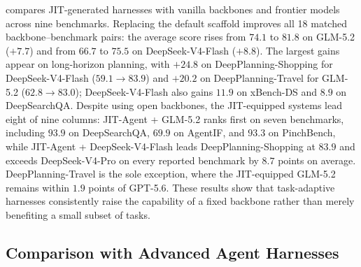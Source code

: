 \documentclass{article}
\newcommand{\ourmethod}{JIT-Agent\xspace}
\begin{document}
 compares JIT-generated harnesses with vanilla backbones and frontier models across nine benchmarks. Replacing the default scaffold improves all 18 matched backbone--benchmark pairs: the average score rises from $74.1$ to $81.8$ on GLM-5.2 ($+7.7$) and from $66.7$ to $75.5$ on DeepSeek-V4-Flash ($+8.8$). The largest gains appear on long-horizon planning, with $+24.8$ on DeepPlanning-Shopping for DeepSeek-V4-Flash ($59.1\!\rightarrow\!83.9$) and $+20.2$ on DeepPlanning-Travel for GLM-5.2 ($62.8\!\rightarrow\!83.0$); DeepSeek-V4-Flash also gains $11.9$ on xBench-DS and $8.9$ on DeepSearchQA. Despite using open backbones, the JIT-equipped systems lead eight of nine columns: \ourmethod{} + GLM-5.2 ranks first on seven benchmarks, including $93.9$ on DeepSearchQA, $69.9$ on AgentIF, and $93.3$ on PinchBench, while \ourmethod{} + DeepSeek-V4-Flash leads DeepPlanning-Shopping at $83.9$ and exceeds DeepSeek-V4-Pro on every reported benchmark by $8.7$ points on average. DeepPlanning-Travel is the sole exception, where the JIT-equipped GLM-5.2 remains within $1.9$ points of GPT-5.6. These results show that task-adaptive harnesses consistently raise the capability of a fixed backbone rather than merely benefiting a small subset of tasks.

\vspace{-0.5em}
\subsection{Comparison with Advanced Agent Harnesses}
\vspace{-0.5em}
\label{sec:advanced_harness_comparison}
\end{document}
